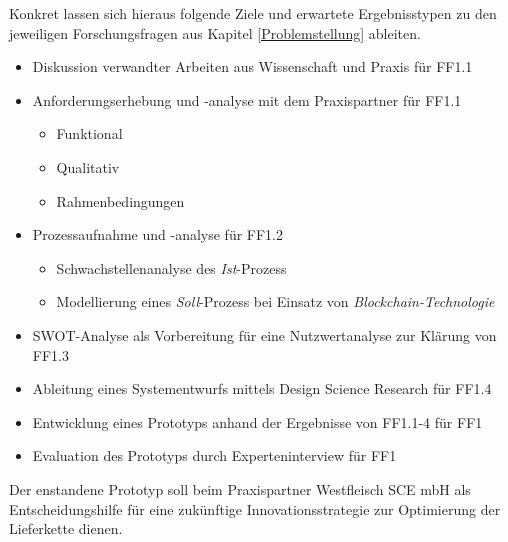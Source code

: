 Konkret lassen sich hieraus folgende Ziele und erwartete Ergebnisstypen zu den jeweiligen Forschungsfragen aus Kapitel \ref{Problemstellung} ableiten.

\begin{itemize}
  \item Diskussion verwandter Arbeiten aus Wissenschaft und Praxis für FF1.1
  \item Anforderungserhebung und -analyse mit dem Praxispartner für FF1.1
  \begin{itemize}
    \item Funktional
    \item Qualitativ
    \item Rahmenbedingungen
  \end{itemize}
  \item Prozessaufnahme und -analyse für FF1.2
  \begin{itemize}
    \item Schwachstellenanalyse des \textit{Ist}-Prozess
    \item Modellierung eines \textit{Soll}-Prozess bei Einsatz von \textit{Blockchain-Technologie}
  \end{itemize}
  \item SWOT-Analyse als Vorbereitung für eine Nutzwertanalyse zur Klärung von FF1.3
  \item Ableitung eines Systementwurfs mittels Design Science Research für FF1.4
  \item Entwicklung eines Prototyps anhand der Ergebnisse von FF1.1-4 für FF1
  \item Evaluation des Prototyps durch Experteninterview für FF1
\end{itemize}

Der enstandene Prototyp soll beim Praxispartner Westfleisch SCE mbH als Entscheidungshilfe für eine zukünftige Innovationsstrategie zur Optimierung der Lieferkette dienen.


